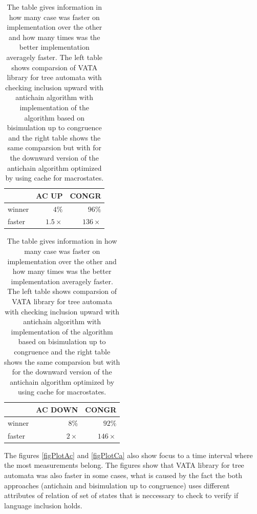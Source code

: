\begin{table}
\begin{center}
\parbox{.45\linewidth}{
  \begin{tabular}[scale=0.3]{ | l | r | r |}
   \hline
    & \textbf{AC UP} & \textbf{CONGR} \\ \hline \hline
    winner & $4\%$ & $96\%$ \\ \hline
    faster & $1.5\times$ & $136\times$ \\ \hline
   \end{tabular}
}
   \parbox{.45\linewidth}{
  \begin{tabular}{ | l | r | r |}
   \hline
    & \textbf{AC DOWN} & \textbf{CONGR} \\ \hline \hline
    winner & $8\%$ & $92\%$ \\ \hline
    faster & $2\times$ & $146\times$ \\ \hline
   \end{tabular}
   }
   \caption{The table gives information in how many case was faster on implementation over the other and how many times was the better implementation
     averagely faster. The left table shows comparsion of VATA library for tree automata with checking inclusion upward with antichain algorithm with
       implementation of the algorithm based on bisimulation up to congruence and
   the right table shows the same comparsion but with for the downward version of the antichain algorithm optimized by using cache for macrostates.}
   \label{tabAc}
\end{center}
\end{table}

The figures \ref{figPlotAc} and \ref{figPlotCa} also show
focus to a time interval where the most measurements belong. The figures show that VATA library for tree automata was
also faster in some cases, what is caused by the fact the both approaches (antichain and bisimulation up to congruence) uses different attributes of relation
of set of states that is neccessary to check to verify if language inclusion holds.

